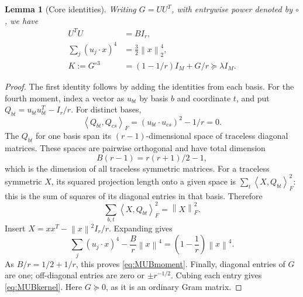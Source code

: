 \documentclass[11pt,letterpaper]{article}
\newtheorem{lemma}[theorem]{Lemma}
\theoremstyle{definition}
\theoremstyle{remark}
\numberwithin{equation}{section}
\newcommand{\norm}[1]{\left\lVert#1\right\rVert}
\newcommand{\ip}[2]{\left\langle#1,#2\right\rangle}
\begin{document}
\begin{lemma}[Core identities]\label{lem:MUB}
Writing $G=UU^T$, with entrywise power denoted by $\circ$, we have
\begin{align}
 U^TU&=BI_r,\label{eq:MUBtight}\\
 \sum_j(u_j\cdot x)^4&=\tfrac32\norm{x}_2^4,\label{eq:MUBmoment}\\
 K:=G^{\circ3}&=(1-1/r)I_M+G/r\succeq\lambda I_M.\label{eq:MUBkernel}
\end{align}
\end{lemma}
\begin{proof}
The first identity follows by adding the identities from each basis. For the fourth moment, index a vector as $u_{bt}$ by basis $b$ and coordinate $t$, and put $Q_{bt}=u_{bt}u_{bt}^T-I_r/r$. For distinct bases,
\[
 \ip{Q_{bt}}{Q_{cs}}_F=(u_{bt}\cdot u_{cs})^2-1/r=0.
\]
The $Q_{bt}$ for one basis span its $(r-1)$-dimensional space of traceless diagonal matrices. These spaces are pairwise orthogonal and have total dimension
\[
 B(r-1)=r(r+1)/2-1,
\]
which is the dimension of all traceless symmetric matrices. For a traceless symmetric $X$, its squared projection length onto a given space is $\sum_t\ip{X}{Q_{bt}}_F^2$: this is the sum of squares of its diagonal entries in that basis. Therefore
\[
 \sum_{b,t}\ip{X}{Q_{bt}}_F^2=\norm{X}_F^2.
\]
Insert $X=xx^T-\norm{x}^2I_r/r$. Expanding gives
\[
 \sum_j(u_j\cdot x)^4-\frac Br\norm{x}^4
 =\left(1-\frac1r\right)\norm{x}^4.
\]
As $B/r=1/2+1/r$, this proves \eqref{eq:MUBmoment}. Finally, diagonal entries of $G$ are one; off-diagonal entries are zero or $\pm r^{-1/2}$. Cubing each entry gives \eqref{eq:MUBkernel}. Here $G\succeq0$, as it is an ordinary Gram matrix.
\end{proof}
\end{document}

